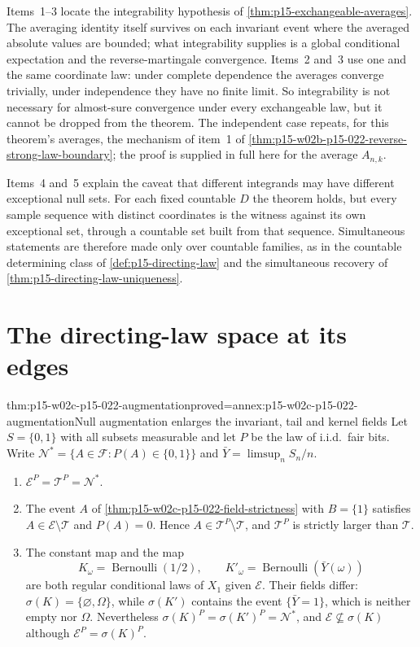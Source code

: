 Items~1--3 locate the integrability hypothesis of
\cref{thm:p15-exchangeable-averages}. The averaging identity itself
survives on each invariant event where the averaged absolute values are
bounded; what integrability supplies is a global conditional expectation
and the reverse-martingale convergence. Items~2 and~3 use one and the same
coordinate law: under complete dependence the averages converge
trivially, under independence they have no finite limit. So integrability
is not necessary for almost-sure convergence under every exchangeable
law, but it cannot be dropped from the theorem. The independent case
repeats, for this theorem's averages, the mechanism of item~1 of
\cref{thm:p15-w02b-p15-022-reverse-strong-law-boundary}; the proof is
supplied in full here for the average \(A_{n,k}\).

Items~4 and~5 explain the caveat that different integrands may have
different exceptional null sets. For each fixed countable \(D\) the
theorem holds, but every sample sequence with distinct coordinates is the
witness against its own exceptional set, through a countable set built
from that sequence. Simultaneous statements are therefore made only over
countable families, as in the countable determining class of
\cref{def:p15-directing-law} and the simultaneous recovery of
\cref{thm:p15-directing-law-uniqueness}.

\section{The directing-law space at its edges}
\label{sec:p15-w02c-p15-022-directing}

\begin{hbtheorem}{thm:p15-w02c-p15-022-augmentation}{proved=annex:p15-w02c-p15-022-augmentation}{Null augmentation enlarges the invariant, tail and kernel fields}
Let \(S=\{0,1\}\) with all subsets measurable and let \(P\) be the law of
i.i.d.\ fair bits. Write \(\mathcal N^*=\{A\in\mathcal F:P(A)\in\{0,1\}\}\)
and \(\bar Y=\limsup_nS_n/n\).
\begin{enumerate}
\item \(\mathcal E^{P}=\mathcal T^{P}=\mathcal N^*\).
\item The event \(A\) of \cref{thm:p15-w02c-p15-022-field-strictness}
      with \(B=\{1\}\) satisfies \(A\in\mathcal E\setminus\mathcal T\)
      and \(P(A)=0\). Hence \(A\in\mathcal T^{P}\setminus\mathcal T\),
      and \(\mathcal T^{P}\) is strictly larger than \(\mathcal T\).
\item The constant map and the map
      \[
       K_\omega=\operatorname{Bernoulli}(1/2),\qquad
       K'_\omega=\operatorname{Bernoulli}(\bar Y(\omega))
      \]
      are both regular conditional laws of \(X_1\) given \(\mathcal E\). Their
      fields differ:
      \(\sigma(K)=\{\varnothing,\Omega\}\), while \(\sigma(K')\)
      contains the event \(\{\bar Y=1\}\), which is neither empty nor
      \(\Omega\). Nevertheless
      \(\sigma(K)^{P}=\sigma(K')^{P}=\mathcal N^*\), and
      \(\mathcal E\not\subseteq\sigma(K)\) although
      \(\mathcal E^{P}=\sigma(K)^{P}\).
\end{enumerate}
\end{hbtheorem}

